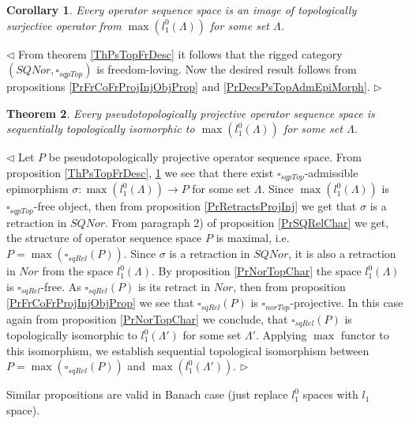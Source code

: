 \documentclass[12pt]{article}
\newtheorem{theorem}{Theorem}[subsection]
\newtheorem{corollary}[theorem]{Corollary}
\newenvironment{proof}{\par $\triangleleft$}{$\triangleright$}
\begin{document}
\begin{corollary}\label{CorSQSpaceIsImgPsTopAdmEpiMorph}
Every operator sequence space is an image of topologically surjective operator from $\max(l_1^0(\Lambda))$ for some set $\Lambda$.
\end{corollary}
\begin{proof}	
From theorem \ref{ThPsTopFrDesc} it follows that the rigged category $(SQNor,\square_{sqpTop})$ is freedom-loving. Now the desired result follows from propositions \ref{PrFrCoFrProjInjObjProp} and \ref{PrDecsPsTopAdmEpiMorph}.
\end{proof}

\begin{theorem}\label{ThPsTopProjDesc}
Every pseudotopologically projective operator sequence space is sequentially topologically isomorphic to  $\max(l_1^0(\Lambda))$ for some set $\Lambda$.
\end{theorem}
\begin{proof}
Let $P$ be pseudotopologically projective operator sequence space. From proposition \ref{ThPsTopFrDesc}, \ref{CorSQSpaceIsImgPsTopAdmEpiMorph} we see that there exist $\square_{sqpTop}$-admissible epimorphism $\sigma:\max(l_1^0(\Lambda))\to P$ for some set $\Lambda$. Since $\max(l_1^0(\Lambda))$ is  $\square_{sqpTop}$-free object, then from proposition \ref{PrRetractsProjInj} we get that $\sigma$ is a  retraction in $SQNor$. From paragraph 2) of proposition \ref{PrSQRelChar} we get, the structure of operator sequence space $P$ is maximal, i.e. $P=\max(\square_{sqRel}(P))$. Since $\sigma$ is a retraction in $SQNor$, it is also a retraction in $Nor$ from the space $l_1^0(\Lambda)$. By proposition \ref{PrNorTopChar} the space $l_1^0(\Lambda)$ is $\square_{sqRel}$-free. As $\square_{sqRel}(P)$ is its retract in $Nor$, then from proposition \ref{PrFrCoFrProjInjObjProp} we see that $\square_{sqRel}(P)$ is  $\square_{norTop}$-projective. In this case again from proposition \ref{PrNorTopChar} we conclude, that $\square_{sqRel}(P)$ is topologically isomorphic to $l_1^0(\Lambda')$ for some set $\Lambda'$. Applying $\max$ functor to this isomorphism, we establish sequential topological isomorphism between  $P=\max(\square_{sqRel}(P))$ and $\max(l_1^0(\Lambda'))$.
\end{proof}

Similar propositions are valid in Banach case (just replace $l_1^0$ spaces with $l_1$ space).
\end{document}
